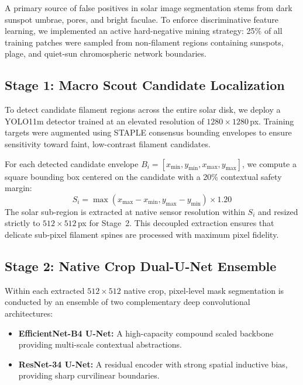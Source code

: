 \documentclass[sigconf]{acmart}
\begin{document}
A primary source of false positives in solar image segmentation stems from dark sunspot umbrae, pores, and bright faculae. To enforce discriminative feature learning, we implemented an active hard-negative mining strategy: 25\% of all training patches were sampled from non-filament regions containing sunspots, plage, and quiet-sun chromospheric network boundaries.

\subsection{Stage 1: Macro Scout Candidate Localization}
To detect candidate filament regions across the entire solar disk, we deploy a YOLO11m detector \cite{glenn2024yolo11} trained at an elevated resolution of $1280\times1280$\,px. Training targets were augmented using STAPLE consensus bounding envelopes to ensure sensitivity toward faint, low-contrast filament candidates.

For each detected candidate envelope $B_i = [x_{\min}, y_{\min}, x_{\max}, y_{\max}]$, we compute a square bounding box centered on the candidate with a 20\% contextual safety margin:
\begin{equation}
S_i = \max(x_{\max} - x_{\min}, y_{\max} - y_{\min}) \times 1.20
\end{equation}
The solar sub-region is extracted at native sensor resolution within $S_i$ and resized strictly to $512\times512$\,px for Stage~2. This decoupled extraction ensures that delicate sub-pixel filament spines are processed with maximum pixel fidelity.

\subsection{Stage 2: Native Crop Dual-U-Net Ensemble}
Within each extracted $512\times512$ native crop, pixel-level mask segmentation is conducted by an ensemble of two complementary deep convolutional architectures:
\begin{itemize}
    \item \textbf{EfficientNet-B4 U-Net:} A high-capacity compound scaled backbone providing multi-scale contextual abstractions.
    \item \textbf{ResNet-34 U-Net:} A residual encoder with strong spatial inductive bias, providing sharp curvilinear boundaries.
\end{itemize}
\end{document}
